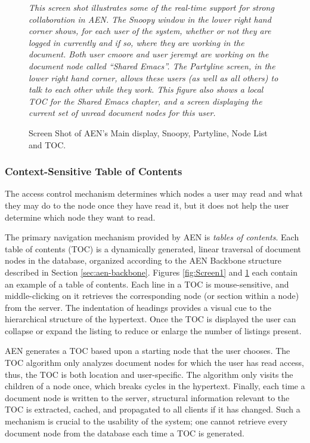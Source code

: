 \begin{figure}%
 \centerline{}
 {\em This screen shot illustrates some of the real-time support
for strong collaboration in AEN.  The Snoopy window in the lower right hand
corner shows, for each user of the system, whether or not they are logged
in currently and if so, where they are working in the document.  Both user
cmoore and user jeremyt are working on the document node called ``Shared
Emacs''.  The Partyline screen, in the lower right hand corner, allows these
users (as well as all others) to talk to each other while they work.  This
figure also shows a local TOC for the Shared Emacs chapter, and a screen
displaying the current set of unread document nodes for this user.}
 \caption{Screen Shot of AEN's Main display, Snoopy, Partyline,  Node List
 and TOC.}
 \label{fig:Screen2}
\end{figure}

\subsubsection{Context-Sensitive Table of Contents}

The access control mechanism determines which nodes a user may read and
what they may do to the node once they have read it, but it does not help
the user determine which node they want to read.

The primary navigation mechanism  provided by AEN is {\em tables of
contents}.  Each table of contents (TOC) is a dynamically generated, linear
traversal of document nodes in the database, organized according to the AEN
Backbone structure described in Section \ref{sec:aen-backbone}.  Figures
\ref{fig:Screen1} and \ref{fig:Screen2} each contain an example of a table
of contents.  Each line in a TOC is mouse-sensitive, and middle-clicking on
it retrieves the corresponding node (or section within a node) from the
server.  The indentation of headings provides a visual cue to the
hierarchical structure of the hypertext.  Once the TOC is displayed the
user can collapse or expand the listing to reduce or enlarge the number of
listings present.


AEN generates a TOC based upon a starting node that the user chooses.  The
TOC algorithm only analyzes document nodes for which the user has read
access, thus, the TOC is both location and user-specific.  The algorithm
only visits the children of a node once, which breaks cycles in the
hypertext. Finally, each time a document node is written to the server,
structural information relevant to the TOC is extracted, cached, and
propagated to all clients if it has changed. Such a mechanism is crucial to
the usability of the system; one cannot retrieve every document node from
the database each time a TOC is generated.


